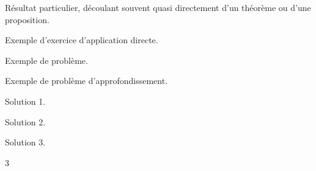 \begin{corollaire*}
	Résultat particulier, découlant souvent quasi directement d'un théorème ou d'une proposition.
\end{corollaire*}

\begin{Exercise}[label=1]%
	Exemple d'exercice d'application directe.
\end{Exercise}
\begin{Exercise}[difficulty=1, label=2]%
	Exemple de problème.
\end{Exercise}
\begin{Exercise}[difficulty=2, label=3]%
	Exemple de problème d'approfondissement.
\end{Exercise}
\shipoutExercise
\begin{Answer}[ref=1]
	Solution 1.
\end{Answer}
\begin{Answer}[ref=2]
	Solution 2.
\end{Answer}
\begin{Answer}[ref=3]
	Solution 3.
\end{Answer}
\begin{multicols}{3}
\shipoutAnswer
\end{multicols}
